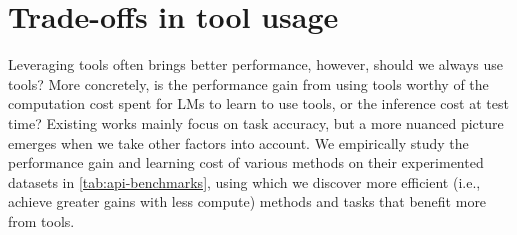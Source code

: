 \section{Trade-offs in tool usage}
\label{sub:trade-off}

Leveraging tools often brings better performance, however, should we always use tools? More concretely, is the performance gain from using tools worthy of the computation cost spent for LMs to learn to use tools, or the inference cost at test time?
Existing works mainly focus on task accuracy, but a more nuanced picture emerges when we take other factors into account.
We empirically study the performance gain and learning cost of various methods on their experimented datasets in \autoref{tab:api-benchmarks}, using which we discover more efficient (i.e., achieve greater gains with less compute) methods and tasks that benefit more from tools.

